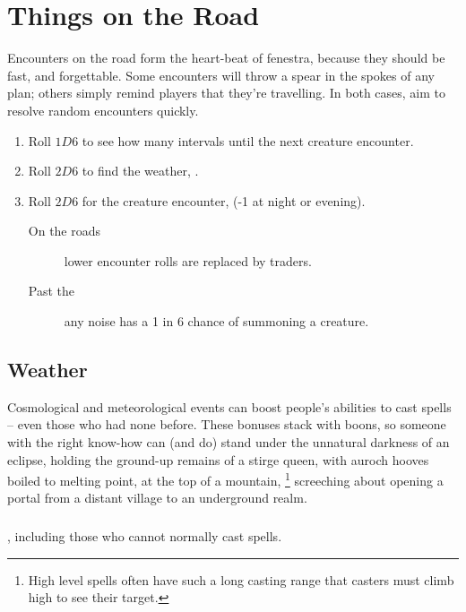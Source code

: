 \section{Things on the Road}
\label{randomEncounters}

\begin{multicols}{2}

\noindent
Encounters on the road form the heart-beat of \gls{fenestra}, because they should be fast, and forgettable.
Some encounters will throw a spear in the spokes of any plan; others simply remind players that they're travelling.
In both cases, aim to resolve random encounters quickly.

\begin{enumerate}
  \item
  Roll $1D6$ to see how many \glspl{interval} until the next creature encounter.
  \item
  Roll $2D6$ to find the weather, .
  \item
  Roll $2D6$ for the creature encounter,  (-1 at night or evening).
  \begin{description}
    \item[On the roads] lower encounter rolls are replaced by traders.
    \item[Past the ] any noise has a 1 in 6 chance of summoning a creature.
  \end{description}
\end{enumerate}

\subsection{Weather}
\label{weather}
Cosmological and meteorological events can boost people's abilities to cast spells -- even those who had none before.
These bonuses stack with \glspl{boon}, so someone with the right know-how can (and do) stand under the unnatural darkness of an eclipse, holding the ground-up remains of a stirge queen, with auroch hooves boiled to melting point, at the top of a mountain,%
\footnote{High level spells often have such a long casting range that casters must climb high to see their target.}
screeching about opening a portal from a distant \gls{village} to an underground realm.

\weatherChart

\subsubsection{}
, including those who cannot normally cast spells.


\end{multicols}
